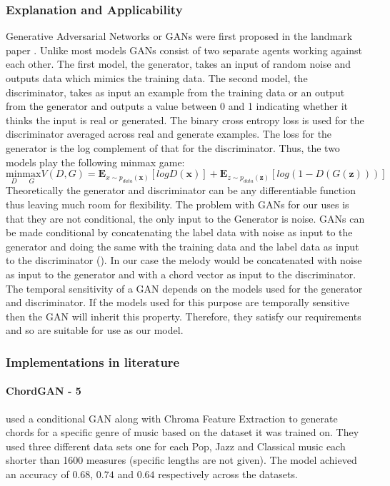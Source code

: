 \subsubsection{Explanation and Applicability}
Generative Adversarial Networks or GANs were first proposed in the landmark paper \cite{GANs}. Unlike most models GANs consist of two separate agents working against each other.
The first model, the generator, takes an input of random noise and outputs data which mimics the training data. 
The second model, the discriminator, takes as input an example from the training data or an output from the generator and outputs a value between 0 and 1 indicating whether it thinks the input is real or generated.
The binary cross entropy loss is used for the discriminator averaged across real and generate examples. The loss for the generator is the log complement of that for the discriminator. Thus, the two models play the following minmax game:
\begin{equation}
\underset{D}{\text{min}} \underset{G}{\text{max}} V(D,G) = \mathbf{E}_{x\sim p_{data}(\mathbf{x})}[logD(\mathbf{x})] + \mathbf{E}_{z\sim p_{data}(\mathbf{z})}[log(1-D(G(\mathbf{z})))]
\end{equation} 
Theoretically the generator and discriminator can be any differentiable function thus leaving much room for flexibility.
The problem with GANs for our uses is that they are not conditional, the only input to the Generator is noise.
GANs can be made conditional by concatenating the label data with noise as input to the generator and doing the same with the training data and the label data as input to the discriminator (\cite{CGANs}). 
In our case the melody would be concatenated with noise as input to the generator and with a chord vector as input to the discriminator.
The temporal sensitivity of a GAN depends on the models used for the generator and discriminator.
If the models used for this purpose are temporally sensitive then the GAN will inherit this property.
Therefore, they satisfy our requirements and so are suitable for use as our model. 

\subsubsection{Implementations in literature}

\paragraph{ChordGAN - 5}  used a conditional GAN along with Chroma Feature Extraction to generate chords for a specific genre of music based on the dataset it was trained on.
They used three different data sets one for each Pop, Jazz and Classical music each shorter than 1600 measures (specific lengths are not given).
The model achieved an accuracy of $0.68$, $0.74$ and $0.64$ respectively across the datasets.

